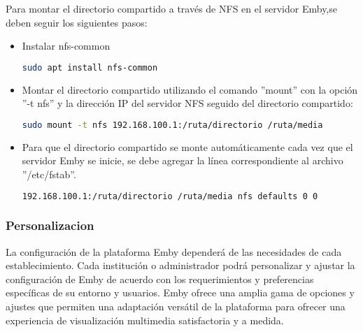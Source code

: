 			Para montar el directorio compartido a través de NFS en el servidor Emby,se deben seguir los siguientes pasos:
			
			\begin{itemize}
				\item Instalar nfs-common
				\begin{lstlisting}[language=Bash, caption=nfs-common]
				sudo apt install nfs-common
				\end{lstlisting}
				
				\item Montar el directorio compartido utilizando el comando ''mount'' con la opción ''-t nfs'' y la dirección IP del servidor NFS seguido del directorio compartido:
				\begin{lstlisting}[language=Bash, caption=mount]
				sudo mount -t nfs 192.168.100.1:/ruta/directorio /ruta/media
				\end{lstlisting}
			
				\item Para que el directorio compartido se monte automáticamente cada vez que el servidor Emby se inicie, se debe agregar la línea correspondiente al archivo ''/etc/fstab''.
				\begin{lstlisting}[language=Bash, caption=fstab]
			192.168.100.1:/ruta/directorio /ruta/media nfs defaults 0 0
				\end{lstlisting}		
			

			
			\end{itemize}
		
			
			\subsubsection{Personalizacion}
			
			
			La configuración de la plataforma Emby dependerá de las necesidades de cada establecimiento. Cada institución o administrador podrá personalizar y ajustar la configuración de Emby de acuerdo con los requerimientos y preferencias específicas de su entorno y usuarios. Emby ofrece una amplia gama de opciones y ajustes que permiten una adaptación versátil de la plataforma para ofrecer una experiencia de visualización multimedia satisfactoria y a medida.
						
